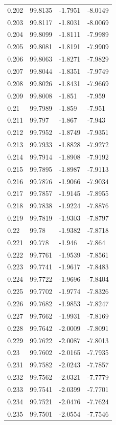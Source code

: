 \begin{tabular}{llll}
0.202 & 99.8135 & -1.7951 & -8.0149 \\
0.203 & 99.8117 & -1.8031 & -8.0069 \\
0.204 & 99.8099 & -1.8111 & -7.9989 \\
0.205 & 99.8081 & -1.8191 & -7.9909 \\
0.206 & 99.8063 & -1.8271 & -7.9829 \\
0.207 & 99.8044 & -1.8351 & -7.9749 \\
0.208 & 99.8026 & -1.8431 & -7.9669 \\
0.209 & 99.8008 & -1.851 & -7.959 \\
0.21 & 99.7989 & -1.859 & -7.951 \\
0.211 & 99.797 & -1.867 & -7.943 \\
0.212 & 99.7952 & -1.8749 & -7.9351 \\
0.213 & 99.7933 & -1.8828 & -7.9272 \\
0.214 & 99.7914 & -1.8908 & -7.9192 \\
0.215 & 99.7895 & -1.8987 & -7.9113 \\
0.216 & 99.7876 & -1.9066 & -7.9034 \\
0.217 & 99.7857 & -1.9145 & -7.8955 \\
0.218 & 99.7838 & -1.9224 & -7.8876 \\
0.219 & 99.7819 & -1.9303 & -7.8797 \\
0.22 & 99.78 & -1.9382 & -7.8718 \\
0.221 & 99.778 & -1.946 & -7.864 \\
0.222 & 99.7761 & -1.9539 & -7.8561 \\
0.223 & 99.7741 & -1.9617 & -7.8483 \\
0.224 & 99.7722 & -1.9696 & -7.8404 \\
0.225 & 99.7702 & -1.9774 & -7.8326 \\
0.226 & 99.7682 & -1.9853 & -7.8247 \\
0.227 & 99.7662 & -1.9931 & -7.8169 \\
0.228 & 99.7642 & -2.0009 & -7.8091 \\
0.229 & 99.7622 & -2.0087 & -7.8013 \\
0.23 & 99.7602 & -2.0165 & -7.7935 \\
0.231 & 99.7582 & -2.0243 & -7.7857 \\
0.232 & 99.7562 & -2.0321 & -7.7779 \\
0.233 & 99.7541 & -2.0399 & -7.7701 \\
0.234 & 99.7521 & -2.0476 & -7.7624 \\
0.235 & 99.7501 & -2.0554 & -7.7546 \\

\end{tabular}
